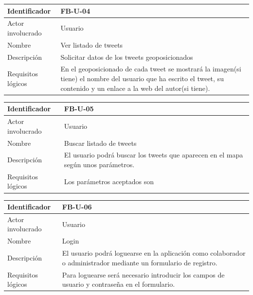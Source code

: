 \begin{table}[!htbp]
\centering
\begin{tabular}{|p{3cm}|p{10cm}|}
\hline
Identificador & FB-U-04 \\ \hline
Actor involucrado & Usuario \\ \hline
Nombre & Ver listado de tweets\\ \hline
Descripción & Solicitar datos de los tweets geoposicionados \\ \hline
Requisitos lógicos & En el geoposicionado de cada tweet se mostrará la imagen(si tiene) el nombre del usuario que ha escrito el tweet, su contenido y un enlace a la web del autor(si tiene).\\ \hline
\end{tabular}
\end{table}


\begin{table}[!htbp]
\centering
\begin{tabular}{|p{3cm}|p{10cm}|}
\hline
Identificador & FB-U-05 \\ \hline
Actor involucrado & Usuario \\ \hline
Nombre &  Buscar listado de tweets\\ \hline
Descripción & El usuario podrá buscar los tweets que aparecen en el mapa según unos parámetros.  \\ \hline
Requisitos lógicos & Los parámetros aceptados son  \\ \hline
\end{tabular}
\end{table}

\begin{table}[!htbp]
\centering
\begin{tabular}{|p{3cm}|p{10cm}|}
\hline
Identificador & FB-U-06 \\ \hline
Actor involucrado & Usuario \\ \hline
Nombre & Login\\ \hline
Descripción & El usuario podrá loguearse en la aplicación como colaborador o administrador mediante un formulario de registro.  \\ \hline
Requisitos lógicos & Para loguearse será necesario introducir los campos de usuario y contraseña en el formulario.\\ \hline
\end{tabular}
\end{table}


